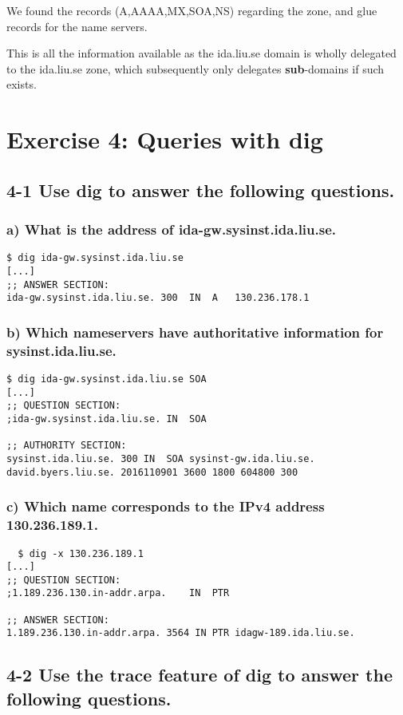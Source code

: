 We found the records (A,AAAA,MX,SOA,NS) regarding the zone, and glue records for the name servers.

This is all the information available as the ida.liu.se domain is wholly delegated to the ida.liu.se zone, which subsequently only delegates \textbf{sub}-domains if such exists.

\section{Exercise 4: Queries with dig}
\subsection{4-1 Use dig to answer the following questions.}
\subsubsection{a) What is the address of ida-gw.sysinst.ida.liu.se.}
\begin{verbatim}$ dig ida-gw.sysinst.ida.liu.se
[...]
;; ANSWER SECTION:
ida-gw.sysinst.ida.liu.se. 300	IN	A	130.236.178.1
\end{verbatim}

\subsubsection{b) Which nameservers have authoritative information for sysinst.ida.liu.se.}
\begin{verbatim}
$ dig ida-gw.sysinst.ida.liu.se SOA
[...]
;; QUESTION SECTION:
;ida-gw.sysinst.ida.liu.se.	IN	SOA

;; AUTHORITY SECTION:
sysinst.ida.liu.se.	300	IN	SOA	sysinst-gw.ida.liu.se. david.byers.liu.se. 2016110901 3600 1800 604800 300
\end{verbatim}

\subsubsection{c) Which name corresponds to the IPv4 address 130.236.189.1.}
\begin{verbatim}
  $ dig -x 130.236.189.1
[...]
;; QUESTION SECTION:
;1.189.236.130.in-addr.arpa.	IN	PTR

;; ANSWER SECTION:
1.189.236.130.in-addr.arpa. 3564 IN	PTR	idagw-189.ida.liu.se.
\end{verbatim}


\subsection{4-2 Use the trace feature of dig to answer the following questions.}
